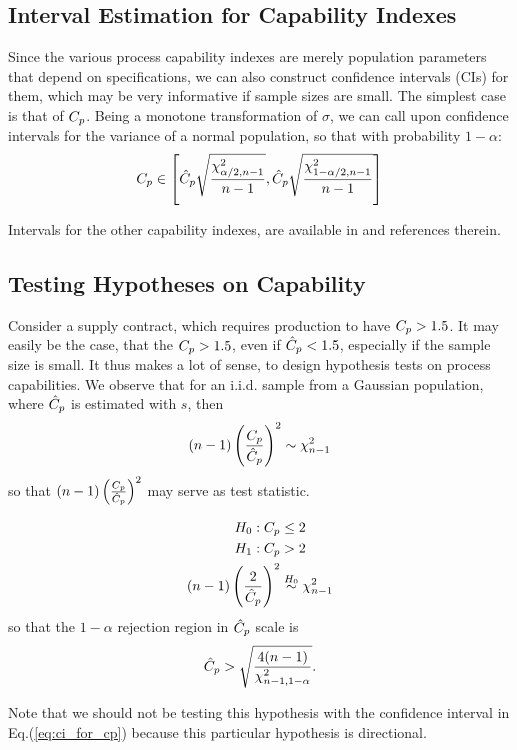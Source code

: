 \subsection{Interval Estimation for Capability Indexes}
Since the various process capability indexes are merely population parameters that depend on specifications, we can also construct confidence intervals (CIs) for them, which may be very informative if sample sizes are small.
The simplest case is that of $C_p$. Being a monotone transformation of $\sigma$, we can call upon confidence intervals for the variance of a normal population, so that with probability $1-\alpha$:
\begin{align}
\label{eq:ci_for_cp}
	C_p \in \left[ 
		\hat{C}_p \sqrt{\frac{\chi^2_{\alpha/2,n-1}}{n-1}},
		\hat{C}_p \sqrt{\frac{\chi^2_{1-\alpha/2,n-1}}{n-1}}
	\right]
\end{align}

Intervals for the other capability indexes, are available in \cite{montgomery_introduction_2007} and references therein. 




\subsection{Testing Hypotheses on Capability}
Consider a supply contract, which requires production to have $C_p>1.5$. 
It may easily be the case, that the $C_p>1.5$, even if $\hat{C}_p<1.5$, especially if the sample size is small.
It thus makes a lot of sense, to design hypothesis tests on process capabilities. 
We observe that for an i.i.d. sample from a Gaussian population, where $\hat{C}_p$ is estimated with $s$, then
\begin{align}
	(n-1) \left( \frac{C_p}{\hat{C}_p} \right)^2  \sim \chi^2_{n-1}
\end{align} 
so that $(n-1) \left( \frac{C_p}{\hat{C}_p} \right)^2 $ may serve as test statistic.

\begin{example}
\begin{align*}
	H_0: C_p &\leq 2	\\
	H_1:C_p &> 2 \\
	(n-1) \left( \frac{2}{\hat{C}_p} \right)^2  &\overset{H_0}{\sim} \chi^2_{n-1}
\end{align*}
so that the $1-\alpha$ rejection region in $\hat{C}_p$ scale is 
\begin{align*}
	\hat{C}_p > \sqrt{\frac{4 (n-1)}{\chi^2_{n-1,1-\alpha}}} .
\end{align*}
\end{example}
Note that we should not be testing this hypothesis with the confidence interval in Eq.(\ref{eq:ci_for_cp}) because this particular hypothesis is directional.



